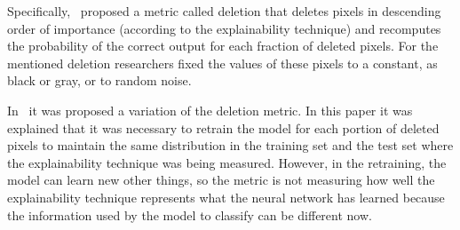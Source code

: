 \documentclass[preprint,12pt]{elsarticle}
\begin{document}
Specifically,~\cite{petsiukRISERandomizedInput} proposed a metric called deletion that deletes pixels in descending order of importance (according to the explainability technique) and recomputes the probability of the correct output for each fraction of deleted pixels. For the mentioned deletion researchers fixed the values of these pixels to a constant, as black or gray, or to random noise. 

In~\cite{hookerBenchmarkInterpretabilityMethods2019} it was proposed a variation of the deletion metric. In this paper it was explained that it was necessary to retrain the model for each portion of deleted pixels to maintain the same distribution in the training set and the test set where the explainability technique was being measured. However, in the retraining, the model can learn new other things, so the metric is not measuring how well the explainability technique represents what the neural network has learned because the information used by the model to classify can be different now.
\end{document}
